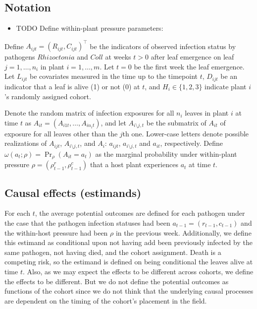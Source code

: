 \documentclass[]{article}
\providecommand{\tightlist}{%
  \setlength{\itemsep}{0pt}\setlength{\parskip}{0pt}}
\begin{document}
\hypertarget{notation}{%
\subsection{Notation}\label{notation}}

\begin{itemize}
\tightlist
\item
  TODO Define within-plant pressure parameters:
\end{itemize}

Define \(A_{ijt} = (R_{ijt}, C_{ijt})^\intercal\) be the indicators of
observed infection status by pathogens \(Rhizoctonia\) and \(Coll\) at
weeks \(t > 0\) after leaf emergence on leaf \(j = 1, \dots, n_i\) in
plant \(i = 1, \dots, m\). Let \(t = 0\) be the first week the leaf
emergence. Let \(L_{ijt}\) be covariates measured in the time up to the
timepoint \(t\), \(D_{ijt}\) be an indicator that a leaf is alive (1) or
not (0) at \(t\), and \(H_{i} \in \{1, 2, 3\}\) indicate plant \(i\)'s
randomly assigned cohort.

Denote the random matrix of infection exposures for all \(n_{i}\) leaves
in plant \(i\) at time \(t\) as
\(A_{it} = (A_{i1t} , \dots, A_{in_it})\), and let
\(A_{i\setminus j, t}\) be the submatrix of \(A_{it}\) of exposure for
all leaves other than the \(j\)th one. Lower-case letters denote
possible realizations of \(A_{ijt}\), \(A_{i\setminus j, t}\), and
\(A_i\): \(a_{ijt}\), \(a_{i\setminus j, t}\) and \(a_{it}\),
respectively. Define
\(\omega(a_{t}; \rho) = \Pr_{\rho}(A_{it} = a_{t})\) as the marginal
probability under within-plant pressure
\(\rho = (\rho^r_{t-1}, \rho^c_{t-1})\) that a host plant experiences
\(a_t\) at time \(t\).

\hypertarget{causal-effects-estimands}{%
\subsection{Causal effects (estimands)}\label{causal-effects-estimands}}

For each \(t\), the average potential outcomes are defined for each
pathogen under the case that the pathogen infection statuses had been
\(a_{t - 1} = (r_{t-1}, c_{t -1})\) and the within-host pressure had
been \(\rho\) in the previous week. Additionally, we define this
estimand as conditional upon not having add been previously infected by
the same pathogen, not having died, and the cohort assignment. Death is
a competing risk, so the estimand is defined on being conditional the
leaves alive at time \(t\). Also, as we may expect the effects to be
different across cohorts, we define the effects to be different. But we
do not define the potential outcomes as functions of the cohort since we
do not think that the underlying causal processes are dependent on the
timing of the cohort's placement in the field.
\end{document}
